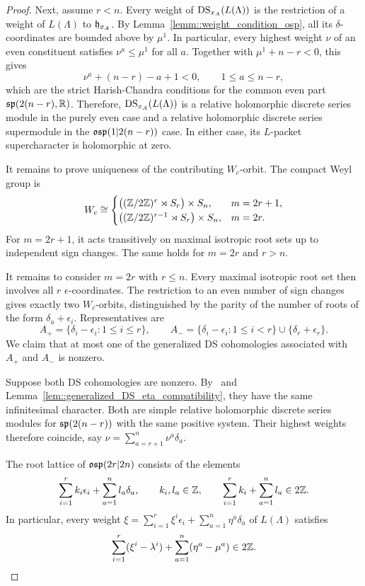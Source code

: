 \begin{proof}
Next, assume $r<n$. Every weight of $\DS_{x_A}(L(\Lambda))$ is the restriction of a weight of $L(\Lambda)$ to $\hh_{x_A}$. By Lemma~\ref{lemm::weight_condition_osp}, all its $\delta$-coordinates are bounded above by $\mu^1$. In particular, every highest weight $\nu$ of an even constituent satisfies $\nu^a\leq\mu^1$ for all $a$. Together with $\mu^1+n-r<0$, this gives
\[
\nu^a+(n-r)-a+1<0,
\qquad 1\leq a\leq n-r,
\]
which are the strict Harish-Chandra conditions for the common even part $\sp(2(n-r),\RR)$. Therefore, $\DS_{x_A}(L(\Lambda))$ is a relative holomorphic discrete series module in the purely even case and a relative holomorphic discrete series supermodule in the $\osp(1\vert2(n-r))$ case. In either case, its $L$-packet supercharacter is holomorphic at zero.




It remains to prove uniqueness of the contributing $W_c$-orbit. The compact Weyl group is
\[
W_c\cong
\begin{cases}
\bigl((\ZZ/2\ZZ)^r\rtimes S_r\bigr)\times S_n,
& m=2r+1,\\
\bigl((\ZZ/2\ZZ)^{r-1}\rtimes S_r\bigr)\times S_n,
& m=2r.
\end{cases}
\]
For $m=2r+1$, it acts transitively on maximal isotropic root sets up to independent sign changes. The same holds for $m=2r$ and $r>n$.


It remains to consider $m=2r$ with $r\leq n$. Every maximal isotropic root set then involves all $r$ $\epsilon$-coordinates. The restriction to an even number of sign changes gives exactly two $W_c$-orbits, distinguished by the parity of the number of roots of the form $\delta_a+\epsilon_i$. Representatives are
\[
A_+=\{\delta_i-\epsilon_i:1\leq i\leq r\},
\qquad
A_-=
\{\delta_i-\epsilon_i:1\leq i<r\}
\cup\{\delta_r+\epsilon_r\}.
\]
We claim that at most one of the generalized DS cohomologies associated with $A_+$ and $A_-$ is nonzero.



Suppose both DS cohomologies are nonzero. By~\cite[Lemmas~6.10--6.11]{gorelik2022duflo} and Lemma~\ref{lem::generalized_DS_eta_compatibility}, they have the same infinitesimal character. Both are simple relative holomorphic discrete series modules for $\sp(2(n-r))$ with the same positive system. Their highest weights therefore coincide, say
$
\nu=\sum_{a=r+1}^n\nu^a\delta_a.
$

The root lattice of $\osp(2r\vert2n)$ consists of the elements
\[
\sum_{i=1}^r k_i\epsilon_i+\sum_{a=1}^n l_a\delta_a,
\qquad k_i,l_a\in\ZZ,
\qquad \sum_{i=1}^r k_i+\sum_{a=1}^n l_a\in2\ZZ.
\]
In particular, every weight
$
\xi=\sum_{i=1}^r\xi^i\epsilon_i+\sum_{a=1}^n\eta^a\delta_a
$
of $L(\Lambda)$ satisfies
\[
\sum_{i=1}^r(\xi^i-\lambda^i)+\sum_{a=1}^n(\eta^a-\mu^a)\in2\ZZ.
\]


\end{proof}
